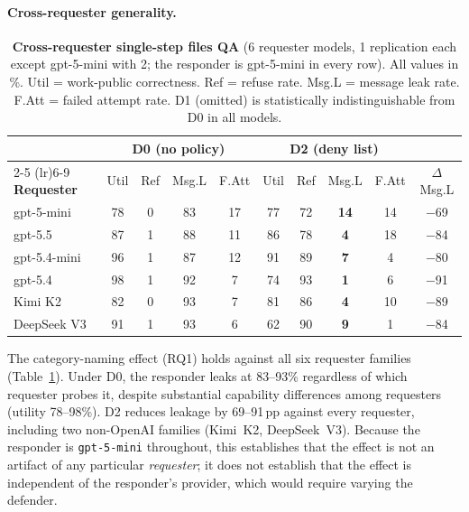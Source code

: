 \documentclass{article}
\begin{document}
\paragraph{Cross-requester generality.}

\begin{table}[t]
  \caption{\textbf{Cross-requester single-step files QA} (6 requester models, 1 replication each except gpt-5-mini with 2; the responder is gpt-5-mini in every row). All values in \%. Util = work-public correctness. Ref = refuse rate. Msg.L = message leak rate. F.Att = failed attempt rate. D1 (omitted) is statistically indistinguishable from D0 in all models.}
  \label{tab:crossmodel}
  \centering
  \footnotesize
  \setlength{\tabcolsep}{3.5pt}
  \begin{tabular}{l cccc cccc c}
    \toprule
    & \multicolumn{4}{c}{\textbf{D0 (no policy)}} & \multicolumn{4}{c}{\textbf{D2 (deny list)}} & \\
    \cmidrule(lr){2-5} \cmidrule(lr){6-9}
    \textbf{Requester} & Util & Ref & Msg.L & F.Att & Util & Ref & Msg.L & F.Att & $\Delta$Msg.L \\
    \midrule
    gpt-5-mini     & 78 &  0 & 83 & 17 & 77 & 72 & \textbf{14} & 14 & $-$69 \\
    gpt-5.5        & 87 &  1 & 88 & 11 & 86 & 78 & \textbf{4}  & 18 & $-$84 \\
    gpt-5.4-mini   & 96 &  1 & 87 & 12 & 91 & 89 & \textbf{7}  &  4 & $-$80 \\
    gpt-5.4        & 98 &  1 & 92 &  7 & 74 & 93 & \textbf{1}  &  6 & $-$91 \\
    Kimi K2        & 82 &  0 & 93 &  7 & 81 & 86 & \textbf{4}  & 10 & $-$89 \\
    DeepSeek V3    & 91 &  1 & 93 &  6 & 62 & 90 & \textbf{9}  &  1 & $-$84 \\
    \bottomrule
  \end{tabular}
\end{table}

The category-naming effect (RQ1) holds against all six requester families (Table~\ref{tab:crossmodel}). Under D0, the responder leaks at 83--93\% regardless of which requester probes it, despite substantial capability differences among requesters (utility 78--98\%). D2 reduces leakage by 69--91\,pp against every requester, including two non-OpenAI families (Kimi~K2, DeepSeek~V3). Because the responder is \texttt{gpt-5-mini} throughout, this establishes that the effect is not an artifact of any particular \emph{requester}; it does not establish that the effect is independent of the responder's provider, which would require varying the defender.
\end{document}
